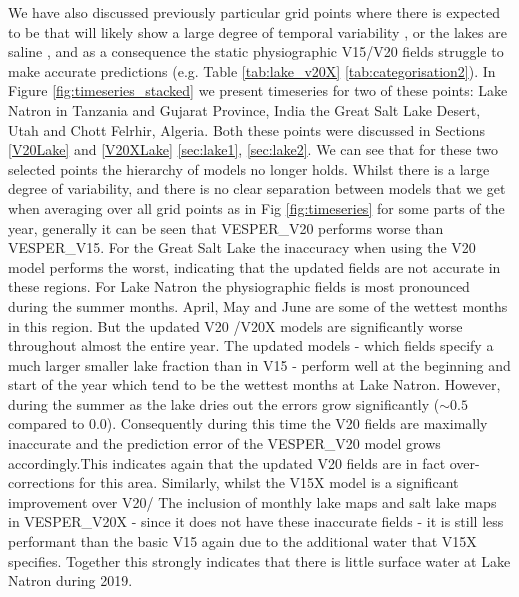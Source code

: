 \documentclass[hess, twostagejnl]{copernicus}
\providecommand{\DIFadd}[1]{{\protect\color{blue} \sf #1}} %
\providecommand{\DIFdel}[1]{{\protect\color{red} \scriptsize #1}} %
\providecommand{\DIFaddbegin}{} %
\providecommand{\DIFaddend}{} %
\providecommand{\DIFdelbegin}{} %
\providecommand{\DIFdelend}{} %
\begin{document}
\DIFdelbegin %
\DIFdelend We have also discussed previously particular grid points \DIFdelbegin \DIFdel{where there is expected to be }\DIFdelend \DIFaddbegin \DIFadd{that will likely show }\DIFaddend a large degree of temporal variability\DIFaddbegin \DIFadd{, }\DIFaddend or the lakes are saline\DIFaddbegin \DIFadd{, }\DIFaddend and as a consequence the static \DIFaddbegin \DIFadd{physiographic }\DIFaddend V15/V20 fields struggle to make accurate predictions (e.g. Table \DIFdelbegin \DIFdel{\ref{tab:lake_v20X}}\DIFdelend \DIFaddbegin \DIFadd{\ref{tab:categorisation2}}\DIFaddend ). In Figure \ref{fig:timeseries_stacked} we present timeseries for two of these points: \DIFdelbegin \DIFdel{Lake Natron in Tanzania and  Gujarat Province, India}\DIFdelend \DIFaddbegin \DIFadd{the Great Salt Lake Desert, Utah and  Chott Felrhir, Algeria}\DIFaddend . Both these points were discussed in Sections \DIFdelbegin \DIFdel{\ref{V20Lake} and \ref{V20XLake}}\DIFdelend \DIFaddbegin \DIFadd{\ref{sec:lake1}, \ref{sec:lake2}}\DIFaddend . We can see that for these two selected points the hierarchy of models no longer holds. Whilst there is a large degree of variability, and there is no clear separation between models \DIFdelbegin \DIFdel{that we get when averaging over all grid points as in Fig \ref{fig:timeseries}}\DIFdelend \DIFaddbegin \DIFadd{for some parts of the year}\DIFaddend , generally it can be seen that \DIFaddbegin \DIFadd{VESPER\_V20 performs worse than VESPER\_V15. For the Great Salt Lake }\DIFaddend the \DIFaddbegin \DIFadd{inaccuracy when using the }\DIFaddend V20 \DIFdelbegin \DIFdel{model performs the worst, indicating that the updated fields are not accurate in these regions. For Lake Natron the }\DIFdelend \DIFaddbegin \DIFadd{physiographic fields is most pronounced during the summer months. April, May and June are some of the wettest months in this region. But the updated }\DIFaddend V20 \DIFdelbegin \DIFdel{/V20X models are significantly worse throughout almost the entire year. The updated models - which }\DIFdelend \DIFaddbegin \DIFadd{fields }\DIFaddend specify a much \DIFdelbegin \DIFdel{larger }\DIFdelend \DIFaddbegin \DIFadd{smaller }\DIFaddend lake fraction than in V15 \DIFdelbegin \DIFdel{- perform well at the beginning and start of the year which tend to be the wettest months at Lake Natron. However,  during the summer as the lake dries out the errors grow significantly}\DIFdelend \DIFaddbegin \DIFadd{($\sim 0.5$ compared to $0.0$). Consequently during this time the V20 fields are maximally inaccurate and the prediction error of the VESPER\_V20 model grows accordingly}\DIFaddend .This indicates again that the updated V20 fields are in fact over-corrections for this area. \DIFdelbegin \DIFdel{Similarly, whilst the V15X model is a significant improvement over V20/}\DIFdelend \DIFaddbegin \DIFadd{The inclusion of monthly lake maps and salt lake maps in VESPER\_}\DIFaddend V20X \DIFdelbegin \DIFdel{- since it does not have these inaccurate fields -  it is still less performant than the basic V15 again due to the additional water that V15X specifies. Together this strongly indicates that there is little surface water at Lake Natron during 2019. }%
\end{document}
